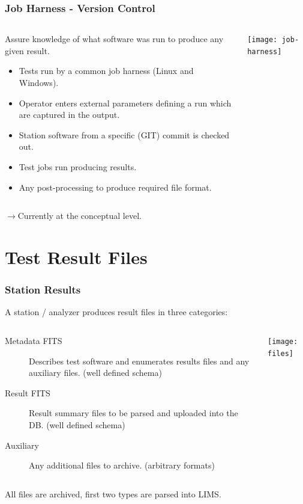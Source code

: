 \documentclass[xcolor=dvipsnames]{beamer}
\begin{document}
\begin{frame}[fragile]
  \frametitle{Job Harness - Version Control}
  \begin{columns}
    \begin{column}{0.5\paperwidth}
      Assure knowledge of what software was run to produce any given
      result.
      \begin{itemize}
      \item Tests run by a common job harness (Linux and Windows).
      \item Operator enters external parameters defining a run which
        are captured in the output.
      \item Station software from a specific (GIT) commit is checked out.
      \item Test jobs run producing results.
      \item Any post-processing to produce required file format.
      \end{itemize}
    \end{column}
    \begin{column}{0.5\paperwidth}
      \texttt{[image: job-harness]}
    \end{column}
  \end{columns}

  \vspace{2mm}

  $\rightarrow$Currently at the conceptual level.
\end{frame}

\section{Test Result Files}

\begin{frame}
  \frametitle{Station Results}

  A station / analyzer produces result files in three categories:

  \begin{columns}
    \begin{column}{0.5\paperwidth}
      \footnotesize
      \begin{description}
      \item[Metadata FITS] Describes test software and enumerates results
        files and any auxiliary files.  (well defined schema)
      \item[Result FITS] Result summary files to be parsed and uploaded
        into the DB. (well defined schema)
      \item[Auxiliary] Any additional files to archive. (arbitrary
        formats)
      \end{description}
    \end{column}
    \begin{column}{0.4\paperwidth}
      \texttt{[image: files]}
    \end{column}
  \end{columns}
  All files are archived, first two types are parsed into LIMS.

\end{frame}
\end{document}
